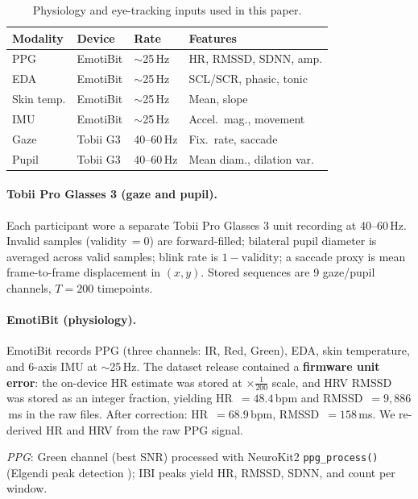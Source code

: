 \documentclass[sigconf,nonacm]{acmart}
\begin{document}
\begin{table}[t]
\caption{Physiology and eye-tracking inputs used in this paper.}
\label{tab:modalities}
\centering
\setlength{\tabcolsep}{2.5pt}
\small
\begin{tabular}{llll}
\toprule
\textbf{Modality} & \textbf{Device} & \textbf{Rate} & \textbf{Features} \\
\midrule
PPG        & EmotiBit & ${\sim}$25\,Hz & HR, RMSSD, SDNN, amp. \\
EDA        & EmotiBit & ${\sim}$25\,Hz & SCL/SCR, phasic, tonic \\
Skin temp. & EmotiBit & ${\sim}$25\,Hz & Mean, slope \\
IMU        & EmotiBit & ${\sim}$25\,Hz & Accel.\ mag., movement \\
Gaze       & Tobii G3 & 40--60\,Hz & Fix.\ rate, saccade \\
Pupil      & Tobii G3 & 40--60\,Hz & Mean diam., dilation var. \\
\bottomrule
\end{tabular}
\end{table}

\paragraph{Tobii Pro Glasses 3 (gaze and pupil).}
Each participant wore a separate Tobii Pro Glasses 3 unit recording at
40--60\,Hz.
Invalid samples (validity\,$=0$) are forward-filled; bilateral pupil diameter
is averaged across valid samples; blink rate is $1-\overline{\text{validity}}$;
a saccade proxy is mean frame-to-frame displacement in $(x,y)$.
Stored sequences are 9 gaze/pupil channels, $T{=}200$ timepoints.

\paragraph{EmotiBit (physiology).}
EmotiBit records PPG (three channels: IR, Red, Green), EDA, skin temperature,
and 6-axis IMU at $\sim$25\,Hz.
The dataset release contained a \textbf{firmware unit error}: the on-device
HR estimate was stored at $\times\frac{1}{200}$ scale, and HRV RMSSD was
stored as an integer fraction, yielding HR~$= 48.4$\,bpm and
RMSSD~$= 9{,}886$\,ms in the raw files.
After correction: HR~$= 68.9$\,bpm, RMSSD~$= 158$\,ms.
We re-derived HR and HRV from the raw PPG signal.

\textit{PPG}: Green channel (best SNR) processed with NeuroKit2
\texttt{ppg\_process()} \cite{makowski2021neurokit2} (Elgendi peak
detection \cite{elgendi2013systolic}); IBI peaks yield HR, RMSSD, SDNN,
and count per window.
\end{document}
